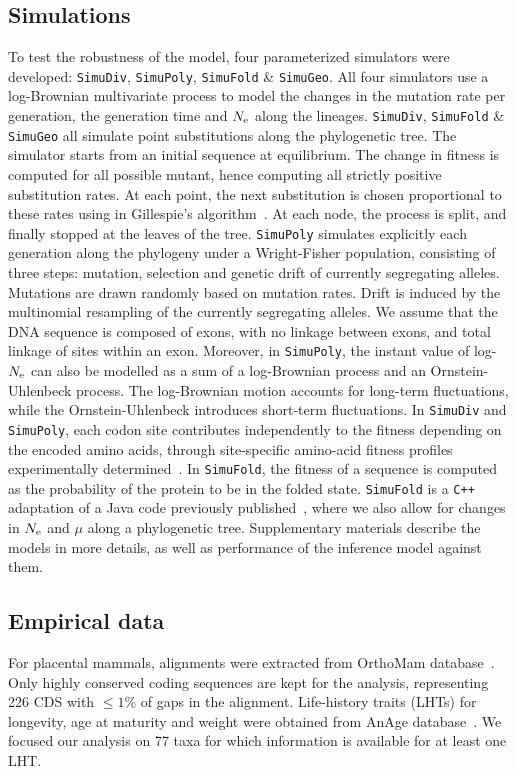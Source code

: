 \documentclass{MBE}
\begin{document}
	\subsection{Simulations}
	\label{sec:Simulation}
	To test the robustness of the model, four parameterized simulators were developed: \texttt{SimuDiv}, \texttt{SimuPoly}, \texttt{SimuFold} \& \texttt{SimuGeo}.
	All four simulators use a log-Brownian multivariate process to model the changes in the mutation rate per generation, the generation time and $N_{\text{e}}$ along the lineages.
	\texttt{SimuDiv}, \texttt{SimuFold} \& \texttt{SimuGeo} all simulate point substitutions along the phylogenetic tree.
	The simulator starts from an initial sequence at equilibrium.
	The change in fitness is computed for all possible mutant, hence computing all strictly positive {substitution} rates.
	At each point, the next {substitution} is chosen proportional to these rates using in Gillespie's algorithm~\citep{Gillespie1977}.
	At each node, the process is split, and finally stopped at the leaves of the tree.
	\texttt{SimuPoly} simulates explicitly each generation along the phylogeny under a Wright-Fisher population, consisting of three steps: mutation, selection and {genetic drift} of currently segregating alleles.
	Mutations are drawn randomly based on mutation rates.
	Drift is induced by the multinomial resampling of the currently segregating alleles.
	We assume that the {DNA} sequence is composed of exons, with no linkage between exons, and total linkage of sites within an exon.
	Moreover, in \texttt{SimuPoly}, the instant value of log-$N_{\text{e}}$ can also be modelled as a sum of a log-Brownian process and an Ornstein-Uhlenbeck process.
	The log-Brownian motion accounts for long-term fluctuations, while the Ornstein-Uhlenbeck introduces short-term fluctuations.
	In \texttt{SimuDiv} and \texttt{SimuPoly}, each {codon} site contributes independently to the fitness depending on the encoded amino acids, through site-specific amino-acid fitness profiles experimentally determined~\citep{Bloom2017}.
	In \texttt{SimuFold}, the fitness of a sequence is computed as the probability of the protein to be in the folded state.
	\texttt{SimuFold} is a \texttt{C++} adaptation of a Java code previously published~\citep{Goldstein2016, Goldstein2017}, where we also allow for changes in $N_{\text{e}}$ and $\mu$ along a phylogenetic tree.
	Supplementary materials describe the models in more details, as well as performance of the inference model against them.

	\subsection{Empirical data}
	For placental mammals, alignments were extracted from OrthoMam database~\citep{Ranwez2007,Scornavacca2019}.
	Only highly conserved coding sequences are kept for the analysis, representing 226 {CDS} with $\leq 1\%$ of gaps in the alignment.
	Life-history traits ({LHT}s) for longevity, age at maturity and weight were obtained from AnAge database~\citep{DEMAGALHAES2009,Tacutu2012}.
	We focused our analysis on 77 taxa for which information is available for at least one {LHT}.
\end{document}
